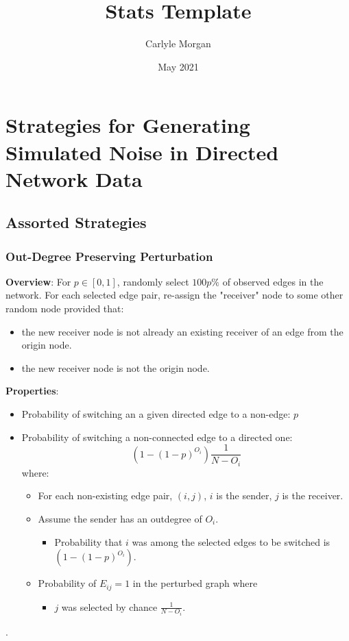 \documentclass{article}
\title{Stats Template}
\author{Carlyle Morgan}
\date{May 2021}
\begin{document}
\section{Strategies for Generating Simulated Noise in Directed Network Data}
\subsection{Assorted Strategies}

\subsubsection{Out-Degree Preserving Perturbation}
\textbf{Overview}: For $p \in [0,1]$, randomly select $100p\%$ of observed edges in the network. For each selected edge pair, re-assign the "receiver" node to some other random node provided that: 
\begin{itemize}
\item the new receiver node is not already an existing receiver of an edge from the origin node. 
\item the new receiver node is not the origin node. \end{itemize}

\textbf{Properties}: \begin{itemize} 
	\item Probability of switching an a given directed edge to a non-edge: $p$ 
	\item Probability of switching a non-connected edge to a directed one: $$(1-(1-p)^{O_i})\frac{1}{N-O_i}$$ where: 
		\begin{itemize} 
			\item For each non-existing edge pair, $(i,j)$, $i$ is the sender, $j$ is the receiver. 
			\item Assume the sender has an outdegree of $O_i$. 								\begin{itemize} 
					\item Probability that $i$ was among the selected edges to be switched is $(1-(1-p)^{O_i})$. 
				\end{itemize} 
			\item Probability of $E_{ij} = 1$ in the perturbed graph where 			\begin{itemize} $j$ was not among the $O_i$ original receivers. \item $j $ was selected by chance $\frac{1}{N-O_i}$. 							\end{itemize} 
		\end{itemize} 
\end{itemize}.
\end{document}
